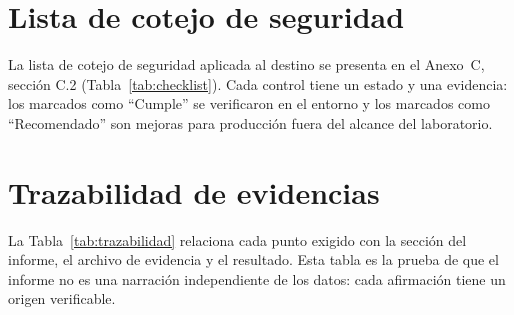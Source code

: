 \section{Lista de cotejo de seguridad}

La lista de cotejo de seguridad aplicada al destino se presenta en el
Anexo~C, sección C.2 (Tabla~\ref{tab:checklist}). Cada control tiene un estado
y una evidencia: los marcados como ``Cumple'' se verificaron en el entorno y
los marcados como ``Recomendado'' son mejoras para producción fuera del
alcance del laboratorio.

\section{Trazabilidad de evidencias}

La Tabla~\ref{tab:trazabilidad} relaciona cada punto exigido con la sección
del informe, el archivo de evidencia y el resultado. Esta tabla es la prueba
de que el informe no es una narración independiente de los datos: cada
afirmación tiene un origen verificable.

